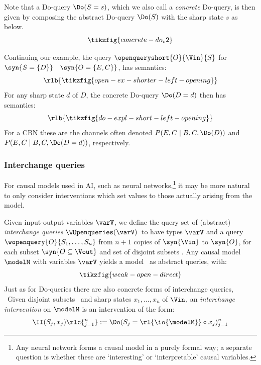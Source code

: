 \documentclass{article}
\begin{document}
Note that a Do-query $\Do(S=s)$, which we also call a \emph{concrete} Do-query, is then given by composing the abstract Do-query $\Do(S)$ with the sharp state $s$ as below.  
\[
\tikzfig{concrete-do_v2}
\]



\begin{example} \label{ex:do-int}
Continuing our example, the query ${\openqueryshort{O}{\Vin}{S}}$ for $\syn{S=\{D\}}$ \ $\syn{O=\{E,C\}}$, has semantics: 
\[
\rlb{\tikzfig{open-ex-shorter-left-opening}}
\]
For any sharp state $d$ of $D$, the concrete Do-query $\Do(D=d)$ then has semantics: 
\[
\rlb{\tikzfig{do-expl-short-left-opening}}
\]
For a CBN these are the channels often denoted $P(E,C \mid B, C, \Do(D))$ and $P(E,C \mid B, C, \Do(D=d))$, respectively.  
\end{example}

\color{black}


\subsubsection{Interchange queries}

For causal models used in AI, such as neural networks,\footnote{Any neural network forms a causal model in a purely formal way; a separate question is whether these are `interesting' or `interpretable' causal variables.} 
it may be more natural to only consider interventions which set values to those actually arising from the model.  

Given input-output variables $\varV$, we define the query set of (abstract) \emph{interchange queries} $\WOpenqueries(\varV)$\ to have types $\varV$ and a query $\wopenquery{O}{S_1,\dots,S_n}$ from $n+1$ copies of $\syn{\Vin}$ to $\syn{O}$, for each subset 
$\syn{O \subseteq \Vout}$ and set of disjoint subsets . 
Any causal model $\modelM$ with variables $\varV$ yields a model \ as abstract queries, with:  
\begin{equation} \label{eq:interchange-query}
\tikzfig{weak-open-direct}
\end{equation}
Just as for Do-queries there are also concrete forms of interchange queries, 
\ 
Given disjoint subsets \ and sharp states $x_1,\dots,x_n$ of $\Vin$, an \emph{interchange intervention} on $\modelM$ is an intervention of the form: 
\[
\II(S_j, x_j)\rlc{^n_{j=1}} := \Do(S_j = \rl{\io{\modelM}} \circ x_j)^n_{j=1}
\]
\end{document}
